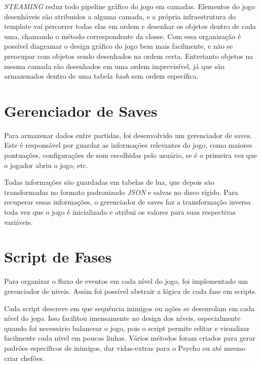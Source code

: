 \textit{STEAMING} reduz todo pipeline gráfico do jogo em camadas. Elementos do jogo desenháveis são atribuidos a alguma camada, e a própria infraestrutura do template vai percorrer todas elas  em ordem e desenhar os objetos dentro de cada uma, chamando o método correspondente da classe. Com essa organização é possível diagramar o design gráfico do jogo bem mais facilmente, e não se preocupar com objetos sendo desenhados na ordem certa. Entretanto objetos na mesma camada são desenhados em uma ordem imprevisível, já que são armazenados dentro de uma tabela \textit{hash} sem ordem específica.

\section{Gerenciador de Saves}
\label{sec:gerenciador_de_saves}

Para armazenar dados entre partidas, foi desenvolvido um gerenciador de saves. Este é responsável por guardar as informações relevantes do jogo, como maiores pontuações, configurações de som escolhidas pelo usuário, se é a primeira vez que o jogador abriu o jogo, etc.

Todas informações são guardadas em tabelas de lua, que depois são transformadas no formato padronizado \textit{JSON} e salvas no disco rígido. Para recuperar essas informações, o gerenciador de saves faz a transformação inversa toda vez que o jogo é inicializado e atribui os valores para suas respectivas variáveis.

\section{Script de Fases}
\label{sec:level_script}

Para organizar o fluxo de eventos em cada nível do jogo, foi implementado um gerenciador de niveis. Assim foi possível abstrair a lógica de cada fase em scripts.

Cada script descreve em que sequência inimigos ou ações se desenrolam em cada nível do jogo. Isso facilitou imensamente no design dos níveis, especialmente quando foi necessário balancear o jogo, pois o script permite editar e visualizar facilmente cada nível em poucas linhas. Vários métodos foram criados para gerar padrões específicos de inimigos, dar vidas-extras para o Psycho ou até mesmo criar chefões.

